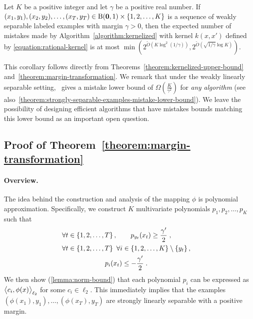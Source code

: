 \begin{corollary}
\label{corollary:weakly-separable-examples-mistake-upper-bound}
Let $K$ be a positive integer and let $\gamma$ be a positive real number. If
$(x_1, y_1), (x_2, y_2), \dots, (x_T, y_T) \in \operatorname{B}(\mathbf{0},1) \times \{1,2,\dots,K\}$
is a sequence of weakly separable labeled examples with margin $\gamma > 0$,
then the expected number of mistakes made by Algorithm~\ref{algorithm:kernelized}
with kernel $k(x,x')$ defined by \eqref{equation:rational-kernel}
is at most $\min (2^{\widetilde{O}(K \log^2
(1/\gamma))}, 2^{\widetilde{O}(\sqrt{1/\gamma} \log K)})$.
\end{corollary}

This corollary follows directly from
Theorems~\ref{theorem:kernelized-upper-bound}
and~\ref{theorem:margin-transformation}. We remark that under the weakly linearly
separable setting,~\citep{Daniely-Helbertal-2013} gives a mistake lower bound of
$\Omega(\frac{K}{\gamma^2})$ for {\em any algorithm} (see also~\autoref{theorem:strongly-separable-examples-mistake-lower-bound}).
We leave the possibility of designing efficient algorithms that
have mistakes bounds matching this lower bound as an important open question.


\subsection{Proof of Theorem~\ref{theorem:margin-transformation}}
\label{section:margin-transformation}

\paragraph{Overview.} The idea behind the construction and analysis of the
mapping $\phi$ is polynomial approximation. Specifically, we construct $K$
multivariate polynomials $p_1, p_2, \dots,p_K$ such that
\begin{align}
\label{equation:poly-pos}
& \forall t \in \cbr{1,2,\dots,T}, \qquad p_{y_t}(x_t) \ge \frac{\gamma'}{2} \; ,
\\
\label{equation:poly-neg}
& \begin{gathered}
\forall t \in \cbr{1,2,\dots,T} \ \forall i \in \cbr{1,2,\ldots,K} \setminus \cbr{y_t}, \\
p_i(x_t) \le - \frac{\gamma'}{2} \; .
\end{gathered}
\end{align}
We then show (\autoref{lemma:norm-bound}) that each polynomial $p_i$ can be
expressed as $\left\langle c_i, \phi(x) \right\rangle_{\ell_2}$ for some $c_i \in \ell_2$. This
immediately implies that the examples $(\phi(x_1),y_1), \ldots,
(\phi(x_T),y_T)$ are strongly linearly separable with a positive margin.

